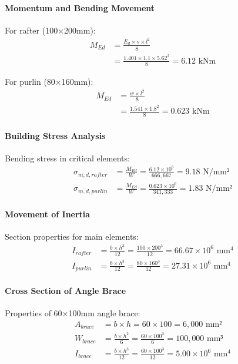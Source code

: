 \documentclass[12pt,a4paper]{article}
\begin{document}
\paragraph{Momentum and Bending Movement}
For rafter (100×200mm):
\begin{equation}
\begin{aligned}
M_{Ed} &= \frac{E_d \times s \times l^2}{8} \\
&= \frac{1.401 \times 1.1 \times 5.62^2}{8} = 6.12 \text{ kNm}
\end{aligned}
\end{equation}

For purlin (80×160mm):
\begin{equation}
\begin{aligned}
M_{Ed} &= \frac{w \times l^2}{8} \\
&= \frac{1.541 \times 1.8^2}{8} = 0.623 \text{ kNm}
\end{aligned}
\end{equation}

\paragraph{Building Stress Analysis}
Bending stress in critical elements:
\begin{equation}
\begin{aligned}
\sigma_{m,d,rafter} &= \frac{M_{Ed}}{W} = \frac{6.12 \times 10^6}{666,667} = 9.18 \text{ N/mm²} \\
\sigma_{m,d,purlin} &= \frac{M_{Ed}}{W} = \frac{0.623 \times 10^6}{341,333} = 1.83 \text{ N/mm²}
\end{aligned}
\end{equation}

\paragraph{Movement of Inertia}
Section properties for main elements:
\begin{equation}
\begin{aligned}
I_{rafter} &= \frac{b \times h^3}{12} = \frac{100 \times 200^3}{12} = 66.67 \times 10^6 \text{ mm}^4 \\
I_{purlin} &= \frac{b \times h^3}{12} = \frac{80 \times 160^3}{12} = 27.31 \times 10^6 \text{ mm}^4
\end{aligned}
\end{equation}

\paragraph{Cross Section of Angle Brace}
Properties of 60×100mm angle brace:
\begin{equation}
\begin{aligned}
A_{brace} &= b \times h = 60 \times 100 = 6,000 \text{ mm²} \\
W_{brace} &= \frac{b \times h^2}{6} = \frac{60 \times 100^2}{6} = 100,000 \text{ mm³} \\
I_{brace} &= \frac{b \times h^3}{12} = \frac{60 \times 100^3}{12} = 5.00 \times 10^6 \text{ mm}^4
\end{aligned}
\end{equation}
\end{document}

